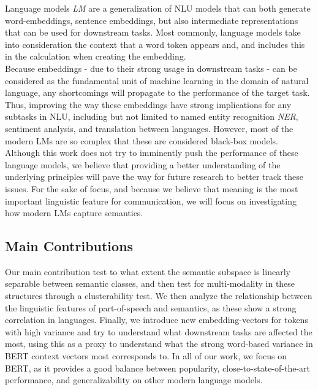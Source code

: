 \documentclass[a4paper,12pt,twoside,openright]{report}
\begin{document}
Language models \textit{LM} are a generalization of NLU models that can both generate word-embeddings, sentence embeddings, but also intermediate representations that can be used for downstream tasks.
Most commonly, language models take into consideration the context that a word token appears and, and includes this in the calculation when creating the embedding. \\

Because embeddings - due to their strong usage in downstream tasks - can be considered as the fundamental unit of machine learning in the domain of natural language, any shortcomings will propagate to the performance of the target task.
Thus, improving the way these embeddings have strong implications for any subtasks in NLU, including but not limited to named entity recognition \textit{NER}, sentiment analysis, and translation between languages. 
However, most of the modern LMs are so complex that these are considered black-box models.
\\

Although this work does not try to imminently push the performance of these language models, we believe that providing a better understanding of the underlying principles will pave the way for future research to better track these issues.
For the sake of focus, and because we believe that meaning is the most important linguistic feature for communication, we will focus on investigating how modern LMs capture semantics. \\


\subsection{Main Contributions}

Our main contribution test to what extent the semantic subspace is linearly separable between semantic classes, and then test for multi-modality in these structures through a clusterability test.
We then analyze the relationship between the linguistic features of part-of-speech and semantics, as these show a strong correlation in languages.
Finally, we introduce new embedding-vectors for tokens with high variance and try to understand what downstream tasks are affected the most, using this as a proxy to understand what the strong word-based variance in BERT context vectors most corresponds to.
In all of our work, we focus on BERT, as it provides a good balance between popularity, close-to-state-of-the-art performance, and generalizability on other modern language models.
\end{document}
